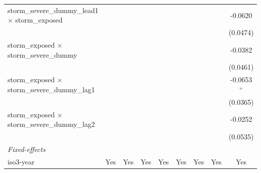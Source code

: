 \begin{tabular}{lcccccccc}
   storm\_severe\_dummy\_lead1 $\times$ storm\_exposed                &                       &                       &                       &                       &                       &                       &                       & -0.0620\\   
                                                                      &                       &                       &                       &                       &                       &                       &                       & (0.0474)\\   
   storm\_exposed $\times$ storm\_severe\_dummy                       &                       &                       &                       &                       &                       &                       &                       & -0.0382\\   
                                                                      &                       &                       &                       &                       &                       &                       &                       & (0.0461)\\   
   storm\_exposed $\times$ storm\_severe\_dummy\_lag1                 &                       &                       &                       &                       &                       &                       &                       & -0.0653$^{+}$\\   
                                                                      &                       &                       &                       &                       &                       &                       &                       & (0.0365)\\   
   storm\_exposed $\times$ storm\_severe\_dummy\_lag2                 &                       &                       &                       &                       &                       &                       &                       & -0.0252\\   
                                                                      &                       &                       &                       &                       &                       &                       &                       & (0.0535)\\   
   \midrule
   \emph{Fixed-effects}\\
   iso3-year                                                          & Yes                   & Yes                   & Yes                   & Yes                   & Yes                   & Yes                   & Yes                   & Yes\\  

\end{tabular}
